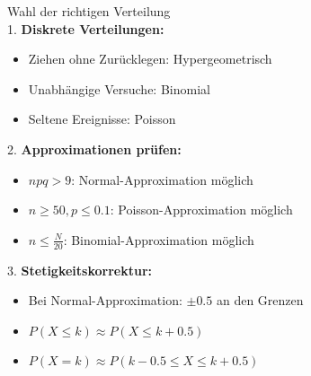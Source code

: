 \begin{KR}{Wahl der richtigen Verteilung}\\
1. \textbf{Diskrete Verteilungen:}
   \begin{itemize}
   \item Ziehen ohne Zurücklegen: Hypergeometrisch
   \item Unabhängige Versuche: Binomial
   \item Seltene Ereignisse: Poisson
   \end{itemize}

2. \textbf{Approximationen prüfen:}
   \begin{itemize}
   \item $npq > 9$: Normal-Approximation möglich
   \item $n \geq 50, p \leq 0.1$: Poisson-Approximation möglich
   \item $n \leq \frac{N}{20}$: Binomial-Approximation möglich
   \end{itemize}

3. \textbf{Stetigkeitskorrektur:}
   \begin{itemize}
   \item Bei Normal-Approximation: $\pm 0.5$ an den Grenzen
   \item $P(X \leq k) \approx P(X \leq k + 0.5)$
   \item $P(X = k) \approx P(k - 0.5 \leq X \leq k + 0.5)$
   \end{itemize}
\end{KR}

